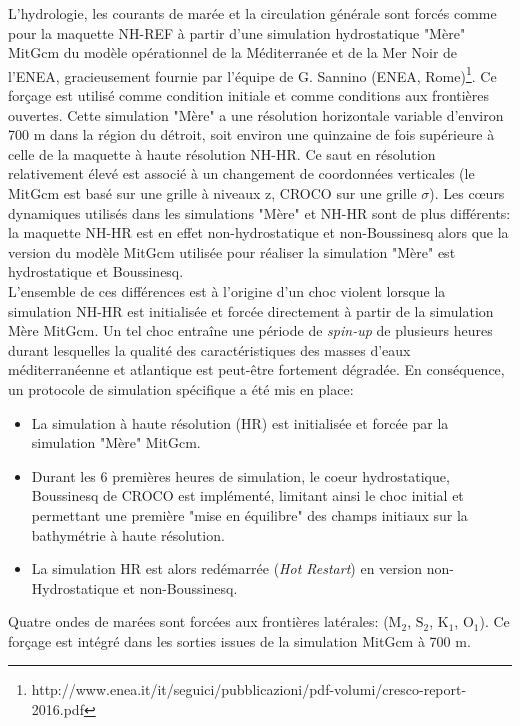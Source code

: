 \documentclass[a4paper,11pt]{report}
\begin{document}
L'hydrologie, les courants de marée et la circulation générale sont forcés comme pour la maquette NH-REF à partir d'une simulation hydrostatique "Mère" MitGcm du modèle opérationnel de la Méditerranée et de la Mer Noir de l'ENEA, gracieusement fournie par l'équipe de G. Sannino (ENEA, Rome)\footnote{http://www.enea.it/it/seguici/pubblicazioni/pdf-volumi/cresco-report-2016.pdf}. Ce forçage est utilisé comme condition initiale et comme conditions aux frontières ouvertes. Cette simulation "Mère" a une résolution horizontale variable d'environ 700 m dans la région du détroit, soit environ une quinzaine de fois supérieure à celle de la maquette à haute résolution NH-HR. Ce saut en résolution relativement élevé est associé à un changement de coordonnées verticales (le MitGcm est basé sur une grille à niveaux z, CROCO sur une grille $\sigma$).  Les cœurs dynamiques utilisés dans les simulations "Mère" et NH-HR sont de plus différents: la maquette NH-HR est en effet non-hydrostatique et non-Boussinesq alors que la version du modèle MitGcm utilisée pour réaliser la simulation "Mère" est hydrostatique et Boussinesq.\\
L'ensemble de ces différences est à l'origine d'un choc violent lorsque la simulation NH-HR est initialisée et forcée directement à partir de la simulation Mère MitGcm. Un tel choc entraîne une période de \textit{spin-up} de plusieurs heures durant lesquelles la qualité des caractéristiques des masses d'eaux méditerranéenne et atlantique est peut-être fortement dégradée. En conséquence, un protocole de simulation spécifique a été mis en place:
\begin{itemize}
	\item La simulation à haute résolution (HR) est initialisée et forcée par la simulation "Mère" MitGcm.
	\item Durant les 6 premières heures de simulation, le coeur hydrostatique, Boussinesq de CROCO est implémenté, limitant ainsi le choc initial et permettant une première "mise en équilibre" des champs initiaux sur la bathymétrie à haute résolution.
	\item La simulation HR est alors redémarrée (\textit{Hot Restart}) en version non-Hydrostatique et non-Boussinesq.
\end{itemize}
Quatre ondes de marées sont forcées aux frontières latérales: ($\text{M}_{\text{2}}$, $\text{S}_{\text{2}}$, $\text{K}_{\text{1}}$, $\text{O}_{\text{1}}$). Ce forçage est intégré dans les sorties issues de la simulation MitGcm à 700 m.\\
\end{document}
